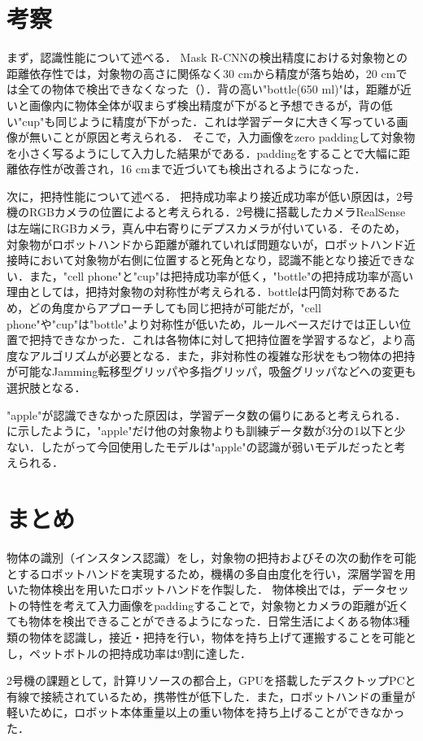 \section{考察}
まず，認識性能について述べる．
Mask R-CNNの検出精度における対象物との距離依存性では，対象物の高さに関係なく30 cmから精度が落ち始め，20 cmでは全ての物体で検出できなくなった（）．背の高い"bottle(650 ml)"は，距離が近いと画像内に物体全体が収まらず検出精度が下がると予想できるが，背の低い"cup"も同じように精度が下がった．これは学習データに大きく写っている画像が無いことが原因と考えられる．
そこで，入力画像をzero paddingして対象物を小さく写るようにして入力した結果がである．paddingをすることで大幅に距離依存性が改善され，16 cmまで近づいても検出されるようになった．

次に，把持性能について述べる．
把持成功率より接近成功率が低い原因は，2号機のRGBカメラの位置によると考えられる．2号機に搭載したカメラRealSenseは左端にRGBカメラ，真ん中右寄りにデプスカメラが付いている．そのため，対象物がロボットハンドから距離が離れていれば問題ないが，ロボットハンド近接時において対象物が右側に位置すると死角となり，認識不能となり接近できない．また，"cell phone"と"cup"は把持成功率が低く，"bottle"の把持成功率が高い理由としては，把持対象物の対称性が考えられる．bottleは円筒対称であるため，どの角度からアプローチしても同じ把持が可能だが，"cell phone"や"cup"は"bottle"より対称性が低いため，ルールベースだけでは正しい位置で把持できなかった．これは各物体に対して把持位置を学習するなど，より高度なアルゴリズムが必要となる．また，非対称性の複雑な形状をもつ物体の把持が可能なJamming転移型グリッパ\cite{jamminggripper}や多指グリッパ，吸盤グリッパなどへの変更も選択肢となる．

"apple"が認識できなかった原因は，学習データ数の偏りにあると考えられる．に示したように，"apple"だけ他の対象物よりも訓練データ数が3分の1以下と少ない．したがって今回使用したモデルは"apple"の認識が弱いモデルだったと考えられる．


\section{まとめ}
物体の識別（インスタンス認識）をし，対象物の把持およびその次の動作を可能とするロボットハンドを実現するため，機構の多自由度化を行い，深層学習を用いた物体検出を用いたロボットハンドを作製した．
物体検出では，データセットの特性を考えて入力画像をpaddingすることで，対象物とカメラの距離が近くても物体を検出できることができるようになった．日常生活によくある物体3種類の物体を認識し，接近・把持を行い，物体を持ち上げて運搬することを可能とし，ペットボトルの把持成功率は9割に達した．

2号機の課題として，計算リソースの都合上，GPUを搭載したデスクトップPCと有線で接続されているため，携帯性が低下した．また，ロボットハンドの重量が軽いために，ロボット本体重量以上の重い物体を持ち上げることができなかった．